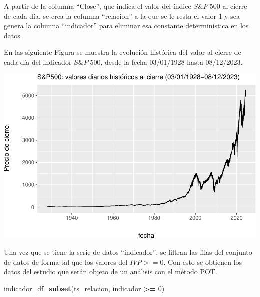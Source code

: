 \documentclass[
  12pt]{article}
\newenvironment{Shaded}{\begin{snugshade}}{\end{snugshade}}
\newcommand{\AttributeTok}[1]{\textcolor[rgb]{0.13,0.29,0.53}{#1}}
\newcommand{\DecValTok}[1]{\textcolor[rgb]{0.00,0.00,0.81}{#1}}
\newcommand{\FunctionTok}[1]{\textcolor[rgb]{0.13,0.29,0.53}{\textbf{#1}}}
\newcommand{\NormalTok}[1]{#1}
\newcommand{\OtherTok}[1]{\textcolor[rgb]{0.56,0.35,0.01}{#1}}
\newcommand{\SpecialCharTok}[1]{\textcolor[rgb]{0.81,0.36,0.00}{\textbf{#1}}}
\begin{document}
A partir de la columna ``Close'', que indica el valor del índice
\(S\&P\;500\) al cierre de cada día, se crea la columna ``relacion'' a
la que se le resta el valor 1 y sea genera la columna ``indicador'' para
eliminar esa constante determinística en los datos.

\begin{Shaded}
\end{Shaded}

En las siguiente Figura se muestra la evolución histórica del valor al
cierre de cada día del indicador \(S\&P\;500\), desde la fecha
03/01/1928 hasta 08/12/2023.

\includegraphics{Entrega_files/figure-latex/plot1-1.pdf}

Una vez que se tiene la serie de datos ``indicador'', se filtran las
filas del conjunto de datos de forma tal que los valores del \(IVP>=0\).
Con esto se obtienen los datos del estudio que serán objeto de un
análisis con el método POT.

\begin{Shaded}
\begin{Highlighting}[]
\NormalTok{indicador\_df}\OtherTok{=}\FunctionTok{subset}\NormalTok{(ts\_relacion, indicador }\SpecialCharTok{\textgreater{}=} \DecValTok{0}\NormalTok{)}
\end{Highlighting}
\end{Shaded}
\end{document}
